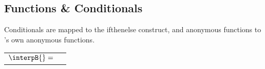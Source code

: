 \subsection{Functions \& Conditionals}
\label{sec:semantics:functions}

Conditionals are mapped to the \idris{} ifthenelse construct, and anonymous functions to \idris{}'s own anonymous functions.

\begin{center}
\begin{tabularx}{0.8\textwidth}{>{$}r<{$}>{\ttfamily}X}
\interpB{}     =& \\
\end{tabularx}
\end{center}

